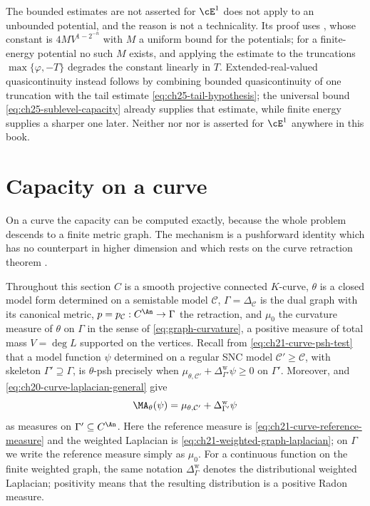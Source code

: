 \begin{warning}{The bounded estimates are not asserted for
\texorpdfstring{$\cE^1$}{E1}}
 does not apply to an unbounded potential,
and the reason is not a technicality.  Its proof uses
, whose constant is
$4MV^{1-2^{-n}}$ with $M$ a uniform bound for the potentials; for a
finite-energy potential no such $M$ exists, and applying the estimate to
the truncations $\max\{\varphi,-T\}$ degrades the constant linearly in
$T$.  Extended-real-valued quasicontinuity instead follows by combining
bounded quasicontinuity of one truncation with the tail estimate
\eqref{eq:ch25-tail-hypothesis}; the universal bound
\eqref{eq:ch25-sublevel-capacity} already supplies that estimate, while
finite energy supplies a sharper one later.  Neither
 nor  nor
 is asserted for $\cE^1$
anywhere in this book.
\end{warning}

\section{Capacity on a curve}
\label{sec:ch25-curves}

On a curve the capacity can be computed exactly, because the whole problem
descends to a finite metric graph.  The mechanism is a pushforward identity
which has no counterpart in higher dimension and which rests on the curve
retraction theorem .

Throughout this section $C$ is a smooth projective connected $K$-curve,
$\theta$ is a closed model form determined on a semistable model
$\mathcal C$, $\Gamma=\Delta_{\mathcal C}$ is the dual graph with its
canonical metric, $p=p_{\mathcal C}:C^{\An}\to\Gamma$ the retraction, and
$\mu_0$ the curvature measure of $\theta$ on $\Gamma$ in the sense of
\eqref{eq:graph-curvature}, a positive measure of total mass $V=\deg L$
supported on the vertices.  Recall from \eqref{eq:ch21-curve-psh-test} that a
model function $\psi$ determined on a regular SNC model
$\mathcal C'\geq\mathcal C$, with skeleton
$\Gamma'\supseteq\Gamma$, is $\theta$-psh precisely when
$\mu_{\theta,\mathcal C'}+
\Delta^{\mathrm w}_{\Gamma'}\psi\geq0$ on $\Gamma'$.  Moreover,
 and
\eqref{eq:ch20-curve-laplacian-general} give
\begin{equation}
\label{eq:ch25-curve-ma}
 \MA_\theta(\psi)
 =\mu_{\theta,\mathcal C'}+\Delta^{\mathrm w}_{\Gamma'}\psi
\end{equation}
as measures on $\Gamma'\subseteq C^{\An}$.  Here the reference measure is
\eqref{eq:ch21-curve-reference-measure} and the weighted Laplacian is
\eqref{eq:ch21-weighted-graph-laplacian}; on $\Gamma$ we write the
reference measure simply as $\mu_0$.
For a continuous function on the finite weighted graph, the same notation
$\Delta^{\mathrm w}_\Gamma$ denotes the distributional weighted
Laplacian; positivity means that the resulting distribution is a positive
Radon measure.

